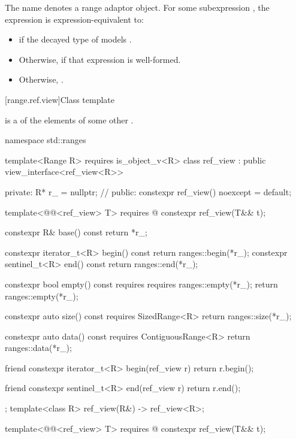 \pnum
The name  denotes a
range adaptor object.
For some subexpression , the expression
 is expression-equivalent to:

\begin{itemize}
\item {} if the decayed type of 
models .

\item Otherwise,  if that expression is well-formed.

\item Otherwise, .
\end{itemize}

[range.ref.view]{Class template }

\pnum
{} is a  of the elements of some other .
\begin{codeblock}
namespace std::ranges {
  template<Range R>
    requires is_object_v<R>
  class ref_view : public view_interface<ref_view<R>> {
  private:
    R* r_ = nullptr;            // \expos
  public:
    constexpr ref_view() noexcept = default;

    template<@@<ref_view> T>
      requires @\seebelow@
    constexpr ref_view(T&& t);

    constexpr R& base() const { return *r_; }

    constexpr iterator_t<R> begin() const { return ranges::begin(*r_); }
    constexpr sentinel_t<R> end() const { return ranges::end(*r_); }

    constexpr bool empty() const
      requires requires { ranges::empty(*r_); }
    { return ranges::empty(*r_); }

    constexpr auto size() const requires SizedRange<R>
    { return ranges::size(*r_); }

    constexpr auto data() const requires ContiguousRange<R>
    { return ranges::data(*r_); }

    friend constexpr iterator_t<R> begin(ref_view r)
    { return r.begin(); }

    friend constexpr sentinel_t<R> end(ref_view r)
    { return r.end(); }
  };
  template<class R>
    ref_view(R&) -> ref_view<R>;
}
\end{codeblock}

%
\begin{itemdecl}
template<@@<ref_view> T>
  requires @\seebelow@
constexpr ref_view(T&& t);
\end{itemdecl}

